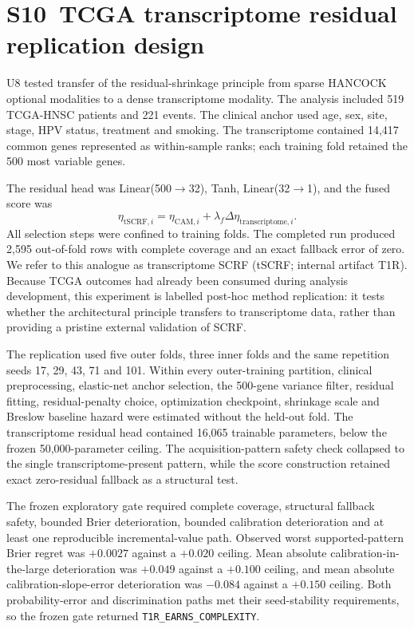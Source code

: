 \documentclass[pdflatex,sn-nature]{sn-jnl}
\begin{document}
\section*{S10~TCGA transcriptome residual replication design}
U8 tested transfer of the residual-shrinkage principle from sparse HANCOCK optional modalities to a dense transcriptome modality. The analysis included 519 TCGA-HNSC patients and 221 events. The clinical anchor used age, sex, site, stage, HPV status, treatment and smoking. The transcriptome contained 14,417 common genes represented as within-sample ranks; each training fold retained the 500 most variable genes.

The residual head was Linear(500$\rightarrow$32), Tanh, Linear(32$\rightarrow$1), and the fused score was
\begin{equation}
\eta_{\mathrm{tSCRF},i}=\eta_{\mathrm{CAM},i}+\lambda_f\Delta\eta_{\mathrm{transcriptome},i}.
\end{equation}
All selection steps were confined to training folds. The completed run produced 2,595 out-of-fold rows with complete coverage and an exact fallback error of zero. We refer to this analogue as transcriptome SCRF (tSCRF; internal artifact T1R). Because TCGA outcomes had already been consumed during analysis development, this experiment is labelled post-hoc method replication: it tests whether the architectural principle transfers to transcriptome data, rather than providing a pristine external validation of SCRF.

The replication used five outer folds, three inner folds and the same repetition seeds 17, 29, 43, 71 and 101. Within every outer-training partition, clinical preprocessing, elastic-net anchor selection, the 500-gene variance filter, residual fitting, residual-penalty choice, optimization checkpoint, shrinkage scale and Breslow baseline hazard were estimated without the held-out fold. The transcriptome residual head contained 16,065 trainable parameters, below the frozen 50,000-parameter ceiling. The acquisition-pattern safety check collapsed to the single transcriptome-present pattern, while the score construction retained exact zero-residual fallback as a structural test.

The frozen exploratory gate required complete coverage, structural fallback safety, bounded Brier deterioration, bounded calibration deterioration and at least one reproducible incremental-value path. Observed worst supported-pattern Brier regret was $+0.0027$ against a $+0.020$ ceiling. Mean absolute calibration-in-the-large deterioration was $+0.049$ against a $+0.100$ ceiling, and mean absolute calibration-slope-error deterioration was $-0.084$ against a $+0.150$ ceiling. Both probability-error and discrimination paths met their seed-stability requirements, so the frozen gate returned \texttt{T1R\_EARNS\_COMPLEXITY}.
\end{document}
